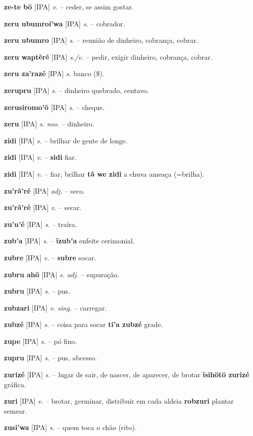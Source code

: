 \textbf{ze-te bö} [IPA] \textit{v.} -- ceder, se assim gostar.

\textbf{zeru ubumroi'wa} [IPA] \textit{s.} -- cobrador.

\textbf{zeru ubumro} [IPA] \textit{s.} -- reunião de dinheiro, cobrança, cobrar.

\textbf{zeru waptẽrẽ} [IPA] \textit{s./v.} -- pedir, exigir dinheiro, cobrança, cobrar.

\textbf{zeru za'razé} [IPA] \textit{s.} banco (\$).

\textbf{zerupru} [IPA] \textit{s.} -- dinheiro quebrado, centavo.

\textbf{zerusiromo'õ} [IPA] \textit{s.} -- cheque.

\textbf{zeru} [IPA] \textit{s. neo.} -- dinheiro.

\textbf{zidi} [IPA] \textit{s.} -- brilhar de gente de longe.

\textbf{zidi} [IPA] \textit{v.} -- \textbf{sidi} fiar.

\textbf{zidi} [IPA] \textit{v.} -- fiar, brilhar  \textbf{tã we zidi} a chuva ameaça (=brilha).

\textbf{zu'rã'ré} [IPA] \textit{adj.} -- seco.

\textbf{zu'rã'ré} [IPA] \textit{v.} -- secar.

\textbf{zu'u'é} [IPA] \textit{s.} -- traíra.

\textbf{zub'a} [IPA] \textit{s.} -- \textbf{ĩzub'a} enfeite cerimonial.

\textbf{zubre} [IPA] \textit{v.} -- \textbf{subre} socar.

\textbf{zubru ahö} [IPA] \textit{s. adj.} -- supuração.

\textbf{zubru} [IPA] \textit{s.} -- pus.

\textbf{zubzari} [IPA] \textit{v. sing.} -- carregar.

\textbf{zubzé} [IPA] \textit{s.} -- coisa para socar  \textbf{ti'a zubzé} grade.

\textbf{zupe} [IPA] \textit{s.} -- pó fino.

\textbf{zupru} [IPA] \textit{s.} -- pus, abcesso.

\textbf{zurizé} [IPA] \textit{s.} -- lugar de sair, de nascer, de aparecer, de brotar  \textbf{ĩsihötö zurizé} gráfica.

\textbf{zuri} [IPA] \textit{v.} -- brotar, germinar, distribuir em cada aldeia  \textbf{robzuri} plantar  semear.

\textbf{zusi'wa} [IPA] \textit{s.} -- quem toca o chão (rito).

